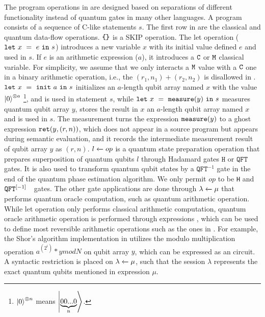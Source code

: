 The \qafny program operations in  are designed based on separations of different functionality instead of quantum gates in many other languages. A program consists of a sequence of C-like statements $s$.
The first row in  are the classical and quantum data-flow operations.
$\sskip$ is a SKIP operation. The let operation ($\sexp{x}{e}{s}$) introduces a new variable $x$ with its initial value defined $e$ and used in $s$. If $e$ is an arithmetic expression ($a$), it introduces a $\cmode$ or $\mmode$ classical variable. For simplicity, we assume that we only interacts a $\mmode$ value with a $\cmode$ one in a binary arithmetic operation, i.e., the $(r_1,n_1)+(r_2,n_2)$ is disallowed in \qafny. $\sexp{x}{\sinit{a}}{s}$ initializes an $a$-length qubit array named $x$ with the value $\ket{0}^{\otimes a}$ \footnote{$\ket{0}^{\otimes n}$ means $\ket{\underbrace{00...0}_\text{n}}$.}, and is used in statement $s$, while
$\sexp{x}{\smea{y}}{s}$ measures quantum qubit array $y$, stores the result in $x$ an $a$-length qubit array named $x$ and is used in $s$.
The measurement turns the expression $\smea{y}$ to a ghost expression $\sret{y,(r,n)}$, which does not appear in a \qafny source program but appears during semantic evaluation, and it records the intermediate measurement result of qubit array $y$ as $(r,n)$.
$\ssassign{l}{}{op}$ is a quantum state preparation operation that prepares superposition of quantum qubits $l$ through Hadamard gates $\texttt{H}$ or $\texttt{QFT}$ gates. It is also used to transform quantum qubit states by a $\texttt{QFT}^{-1}$ gate in the end of the quantum phase estimation algorithm. 
We only permit $op$ to be \texttt{H} and $\iqft[\lbrack -1 \rbrack]{}{}$ gates.
The other gate applications are done through $\ssassign{\lambda}{}{\mu}$ that performs quantum oracle computation, such as quantum arithmetic operation. While let operation only performs classical arithmetic computation, quantum oracle arithmetic operation is performed through \oqasm expressions \cite{oracleoopsla}, which can be used to define most reversible arithmetic operations such as the ones in . 
For example, the Shor's algorithm implementation in  utilizes the modulo multiplication operation $a^(2^i) * y mod N$ on qubit array $y$, which can be expressed as an \oqasm circuit.
A syntactic restriction is placed on $\ssassign{\lambda}{}{\mu}$, such that the session $\lambda$ represents the exact quantum qubits mentioned in expression $\mu$. 

